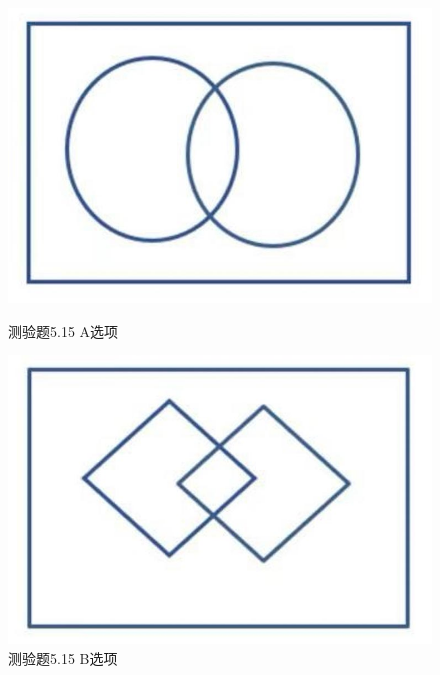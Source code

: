 \documentclass[UTF8, heading=true]{ctexart}
\begin{document}
\begin{figure}[H]
    \centering
    \begin{minipage}[t]{0.3\textwidth}
        \centering
        \includegraphics[width=1\textwidth]{5.15_1.jpg} %
        \caption{测验题5.15 A选项}
    \end{minipage}
	  \hspace{0.1\textwidth} %
    \begin{minipage}[t]{0.3\textwidth}
        \centering
        \includegraphics[width=1\textwidth]{5.15_2.jpg} %
        \caption{测验题5.15 B选项}
\end{minipage}
\end{figure}
\end{document}
